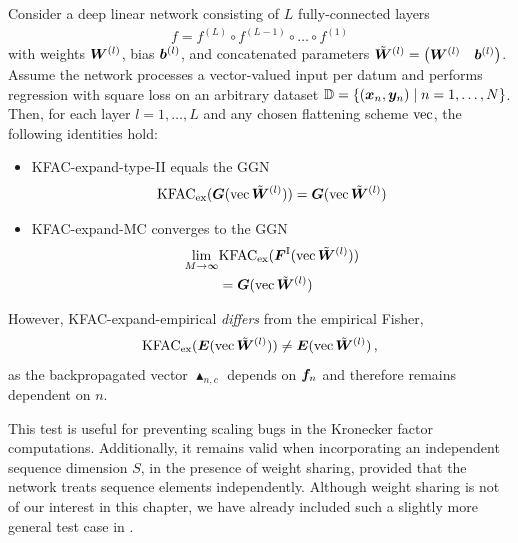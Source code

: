 \begin{test}
  Consider a deep linear network consisting of $L$ fully-connected layers
  \begin{align*}
    f = f^{(L)} \circ f^{(L-1)} \circ \ldots \circ f^{(1)}
  \end{align*}
  with weights $\mW^{(l)}$, bias $\vb^{(l)}$, and concatenated parameters $\tilde{\mW}^{(l)} = \begin{pmatrix} \mW^{(l)} & \vb^{(l)} \end{pmatrix}$.
  Assume the network processes a vector-valued input per datum and performs regression with square loss on an arbitrary dataset $\sD = \{ (\vx_n, \vy_n) \mid n = 1, \dots, N \}$.
  Then, for each layer $l=1,\dots,L$ and any chosen flattening scheme $\vec$, the following identities hold:
  \begin{itemize}[leftmargin=0.5cm]
  \item KFAC-expand-type-II equals the GGN
    \begin{align*}
      \kfac_{\text{ex}}(\mG(\vec \tilde{\mW}^{(l)}))
      =
      \mG(\vec\tilde{\mW}^{(l)})
    \end{align*}
  \item KFAC-expand-MC converges to the GGN
    \begin{align*}
      \lim_{M \to \infty}& \kfac_{\text{ex}}(\mF^{\text{I}}(\vec \tilde{\mW}^{(l)}))
      \\&=
      \mG(\vec \tilde{\mW}^{(l)})
    \end{align*}

  \end{itemize}
  However, KFAC-expand-empirical \emph{differs} from the empirical Fisher,
  \begin{align*}
    \kfac_{\text{ex}}(\mE(\vec \tilde{\mW}^{(l)}))
    \neq
    \mE(\vec \tilde{\mW}^{(l)})\,,
  \end{align*}
  as the backpropagated vector $\blacktriangle_{n,c}$ depends on $\vf_n$ and therefore remains dependent on $n$.
\end{test}

This test is useful for preventing scaling bugs in the Kronecker factor computations.
Additionally, it remains valid when incorporating an independent sequence dimension $S$, \ie in the presence of weight sharing, provided that the network treats sequence elements independently.
Although weight sharing is not of our interest in this chapter, we have already included such a slightly more general test case in .

